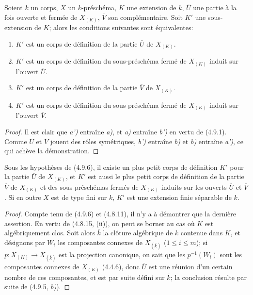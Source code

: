 \begin{proposition}[4.9.6]
\label{IV.2.4.9.6-fr}
Soient $k$ un corps, $X$ un $k$-préschéma, $K$ une extension de $k$,
$\overline U$ une partie à la fois ouverte et fermée de $X_{(K)}$,
$\overline V$ son complémentaire. Soit $K'$ une sous-extension de $K$;
alors les conditions suivantes sont équivalentes:
\begin{enumerate}
\item[\textup{a)}] $K'$ est un corps de définition de la partie $\overline U$ de
$X_{(K)}$.
\item[\textup{a')}] $K'$ est un corps de définition du sous-préschéma fermé de
$X_{(K)}$ induit sur l'ouvert $\overline U$.
\item[\textup{b)}] $K'$ est un corps de définition de la partie $\overline V$ de
$X_{(K)}$.
\item[\textup{b')}] $K'$ est un corps de définition du sous-préschéma fermé de
$X_{(K)}$ induit sur l'ouvert $\overline V$.
\end{enumerate}
\end{proposition}

\begin{proof}
Il est clair que \emph{a')} entraîne \emph{a)}, et \emph{a)} entraîne \emph{b')} en vertu de (4.9.1).
Comme $\overline U$ et $\overline V$ jouent des rôles symétriques, \emph{b')}
entraîne \emph{b)} et \emph{b)} entraîne \emph{a')}, ce qui achève la démonstration.
\end{proof}

\begin{corollary}[4.9.7]
\label{IV.2.4.9.7-fr}
Sous les hypothèses de \textup{(4.9.6)}, il existe un plus petit corps de définition
$K'$ pour la partie $\overline U$ de $X_{(K)}$, et $K'$ est aussi le plus
petit corps de définition de la partie $\overline V$ de $X_{(K)}$ et des
sous-préschémas fermés de $X_{(K)}$ induits sur les ouverts $\overline U$ et
$\overline V$. Si en outre $X$ est de type fini sur $k$, $K'$ est une
extension finie séparable de $k$.
\end{corollary}

\begin{proof}
Compte tenu de (4.9.6) et (4.8.11), il n'y a à démontrer que la dernière
assertion. En vertu de (4.8.15, (ii)), on peut se borner au cas où $K$ est
algébriquement clos. Soit alors $\overline k$ la clôture algébrique de $k$
contenue dans $K$, et désignons par $W_i$ les composantes
connexes de $X_{(\overline k)}$ ($1\leq i\leq m$); si
$p:X_{(K)}\to X_{(\overline k)}$ est la projection canonique, on sait que les
$p^{-1}(W_i)$ sont les composantes connexes de $X_{(K)}$ (4.4.6), donc
$\overline U$ est une réunion d'un certain nombre de ces composantes, et est
par suite défini sur $\overline k$; la conclusion résulte par suite de
(4.9.5, \emph{b)}).
\end{proof}
